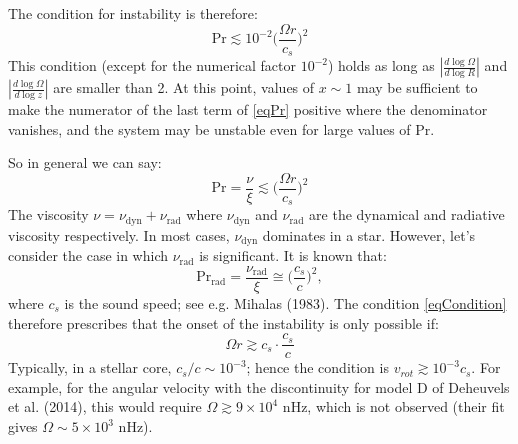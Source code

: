 \documentclass[12pt]{article}
\begin{document}
The condition for instability is therefore:
\begin{equation}
\text{Pr} \lesssim 10^{-2} \Big( \frac{\Omega r}{c_s} \Big)^2
\end{equation}
This condition (except for the numerical factor $10^{-2}$) holds as long as $|\frac{d \log \Omega}{d \log R}|$ and $|\frac{d \log \Omega}{d \log z}|$ are smaller than 2. At this point, values of $x \sim 1$ may be sufficient to make the numerator of the last term of \eqref{eqPr} positive where the denominator vanishes, and the system may be unstable even for large values of $\text{Pr}$.

So in general we can say: 
\begin{equation} \label{eqCondition}
\text{Pr} = \frac{\nu}{\xi} \lesssim \Big( \frac{\Omega r}{c_s} \Big)^2
\end{equation}
The viscosity $\nu = \nu_{\text{dyn}} + \nu_\text{rad}$ where $\nu_\text{dyn}$ and $\nu_\text{rad}$ are the dynamical and radiative viscosity respectively. In most cases, $\nu_\text{dyn}$ dominates in a star. However, let's consider the case in which $\nu_\text{rad}$ is significant. It is known that:
\begin{equation}
\text{Pr}_\text{rad} = \frac{\nu_\text{rad}}{\xi} \cong \Big(\frac{c_s}{c}\Big)^2,
\end{equation}
where $c_s$ is the sound speed; see e.g. Mihalas (1983). The condition \eqref{eqCondition} therefore prescribes that the onset of the instability is only possible if:
\begin{equation}
\Omega r \gtrsim c_s \cdot \frac{c_s}{c}
\end{equation}
Typically, in a stellar core, $c_s/c \sim 10^{-3}$; hence the condition is $v_{rot} \gtrsim 10^{-3} c_s$. For example, for the angular velocity with the discontinuity for model D of Deheuvels et al. (2014), this would require $\Omega \gtrsim 9 \times 10^4$ nHz, which is not observed (their fit gives $\Omega \sim 5 \times 10^3$ nHz).
\end{document}
